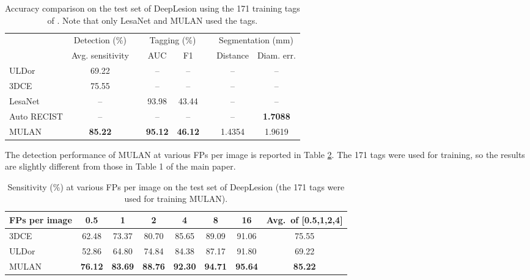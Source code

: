 \documentclass[runningheads]{llncs}
\begin{document}
\begin{table}[]
	\centering
	\setlength{\tabcolsep}{2.6pt}
	\renewcommand{\arraystretch}{1.2}
	\caption{Accuracy comparison on the test set of DeepLesion using the 171 training tags of \cite{Yan2019Lesa}. Note that only LesaNet and MULAN used the tags.}
	\begin{tabular}{lccccccc}
		
		\hline 
		&	\multicolumn{1}{c}{Detection (\%)} && \multicolumn{2}{c}{Tagging (\%)} && \multicolumn{2}{c}{Segmentation (mm)} \\
		\cline{2-8}
		&	Avg. sensitivity	&&	AUC	&	F1	&& Distance	&	Diam. err.	\\
		\hline
		ULDor \cite{Tang2019Uldor}	& 69.22	&& --	& --	&& --	& -- \\
		3DCE \cite{Yan20183DCE}	& 75.55	&& --	& --	&& --	& -- \\
		LesaNet \cite{Yan2019Lesa}	& --	&& 93.98	& 43.44	&& --	& -- \\
		Auto RECIST \cite{Tang2018RECIST} & --	&& --	& --	&& --	& \bf 1.7088 \\
		MULAN	& \bf 85.22	&& \bf 95.12  & \bf 46.12	&& 1.4354 & 1.9619 \\
		\hline
	\end{tabular}
	\label{tbl:res_171tags} 
\end{table}

The detection performance of MULAN at various FPs per image is reported in Table \ref{tbl:acc_det}. The 171 tags were used for training, so the results are slightly different from those in Table 1 of the main paper.

\begin{table}[]
	\centering
\setlength{\tabcolsep}{5pt}
	\renewcommand{\arraystretch}{1.2}
	\caption{Sensitivity (\%) at various FPs per image on the test set of DeepLesion (the 171 tags were used for training MULAN).}
	\begin{tabular}{lccccccc}
		\hline
		FPs per image	& 0.5	& 1		& 2		& 4		& 8		& 16 	& Avg.\ of [0.5,1,2,4] \\
		\hline
		3DCE \cite{Yan20183DCE}	& 62.48	& 73.37	& 80.70	& 85.65	& 89.09	& 91.06	& 75.55 \\
		ULDor \cite{Tang2019Uldor}	& 52.86	& 64.80	& 74.84	& 84.38	& 87.17	& 91.80	& 69.22 \\
		MULAN	& \bf 76.12	& \bf 83.69	& \bf 88.76	& \bf 92.30	& \bf 94.71	& \bf 95.64	& \bf 85.22 \\
		\hline
	\end{tabular}
	
	\label{tbl:acc_det}
\end{table}
\end{document}
